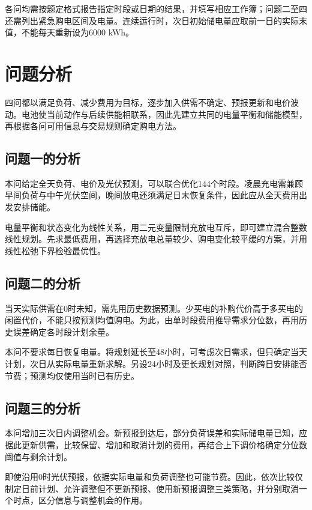 各问均需按题定格式报告指定时段或日期的结果，并填写相应工作簿；问题二至四还需列出紧急购电区间及电量。连续运行时，次日初始储电量应取前一日的实际末值，不能每天重新设为6000 kWh。
\clearpage

\section{问题分析}

四问都以满足负荷、减少费用为目标，逐步加入供需不确定、预报更新和电价波动。电池使当前动作与后续供能相联系，因此先建立共同的电量平衡和储能模型，再根据各问可用信息与交易规则确定购电方法。

\subsection{问题一的分析}

本问给定全天负荷、电价及光伏预测，可以联合优化144个时段。凌晨充电需兼顾早间负荷与中午光伏空间，晚间放电还须满足日末恢复条件，因此应从全天费用出发安排储能。

电量平衡和状态变化为线性关系，用二元变量限制充放电互斥，即可建立混合整数线性规划。先求最低费用，再选择充放电总量较少、购电变化较平缓的方案，并用线性松弛下界检验最优性。

\subsection{问题二的分析}

当天实际供需在0时未知，需先用历史数据预测。少买电的补购代价高于多买电的闲置代价，不能只按预测均值购电。为此，由单时段费用推导需求分位数，再用历史误差确定各时段计划余量。

本问不要求每日恢复电量。将规划延长至48小时，可考虑次日需求，但只确定当天计划，次日从实际电量重新求解。另设24小时及更长规划对照，判断跨日安排能否节费；预测均仅使用当时已有历史。

\subsection{问题三的分析}

本问增加三次日内调整机会。新预报到达后，部分负荷误差和实际储电量已知，应据此更新供需，比较保留、增加和取消计划的费用，再结合上下调价格确定分位数阈值与剩余计划。

即使沿用0时光伏预报，依据实际电量和负荷调整也可能节费。因此，依次比较仅制定日前计划、允许调整但不更新预报、使用新预报调整三类策略，并分别取消一个时点，区分信息与调整机会的作用。

